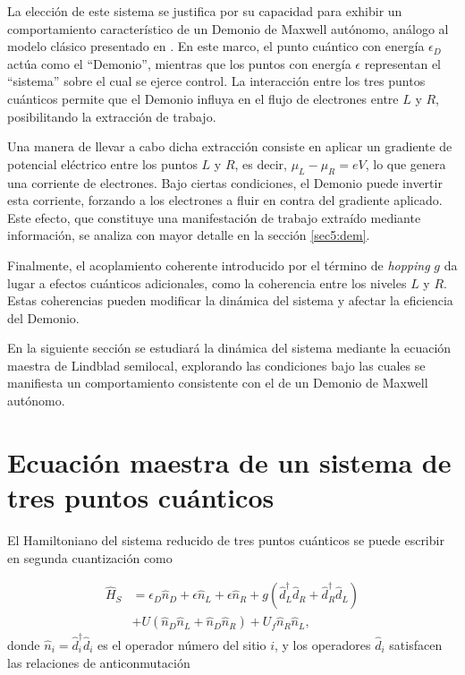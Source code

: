 
La elección de este sistema se justifica por su capacidad para exhibir un comportamiento característico de un Demonio de Maxwell autónomo, análogo al modelo clásico presentado en \cite{horowitz2014thermodynamics}. En este marco, el punto cuántico con energía $\epsilon_D$ actúa como el ``Demonio'', mientras que los puntos con energía $\epsilon$ representan el ``sistema'' sobre el cual se ejerce control. La interacción entre los tres puntos cuánticos permite que el Demonio influya en el flujo de electrones entre $L$ y $R$, posibilitando la extracción de trabajo. 

Una manera de llevar a cabo dicha extracción consiste en aplicar un gradiente de potencial eléctrico entre los puntos $L$ y $R$, es decir, $\mu_{L} - \mu_{R} = eV$, lo que genera una corriente de electrones. Bajo ciertas condiciones, el Demonio puede invertir esta corriente, forzando a los electrones a fluir en contra del gradiente aplicado. Este efecto, que constituye una manifestación de trabajo extraído mediante información, se analiza con mayor detalle en la sección \ref{sec5:dem}. 

Finalmente, el acoplamiento coherente introducido por el término de \textit{hopping} $g$ da lugar a efectos cuánticos adicionales, como la coherencia entre los niveles $L$ y $R$. Estas coherencias pueden modificar la dinámica del sistema y afectar la eficiencia del Demonio. 

En la siguiente sección se estudiará la dinámica del sistema mediante la ecuación maestra de Lindblad semilocal, explorando las condiciones bajo las cuales se manifiesta un comportamiento consistente con el de un Demonio de Maxwell autónomo.

\section{Ecuación maestra de un sistema de tres puntos cuánticos}

El Hamiltoniano del sistema reducido de tres puntos cuánticos se puede escribir en segunda cuantización como 

\begin{align*}
    \hat{H}_{S} & = \epsilon_{D}\hat{n}_{D} + \epsilon \hat{n}_{L} + \epsilon \hat{n}_{R} + g(\hat{d}^{\dagger}_{L}\hat{d}_{R} + \hat{d}^{\dagger}_{R}\hat{d}_{L} ) \\
          & + U(\hat{n}_{D}\hat{n}_{L} + \hat{n}_{D}\hat{n}_{R} )  + U_{f}\hat{n}_{R}\hat{n}_{L},
\end{align*}
donde $\hat{n}_{i} = \hat{d}^{\dagger}_{i} \hat{d}_{i}$ es el operador número del sitio $i$, y los operadores $\hat{d}_{i}$ satisfacen las relaciones de anticonmutación

